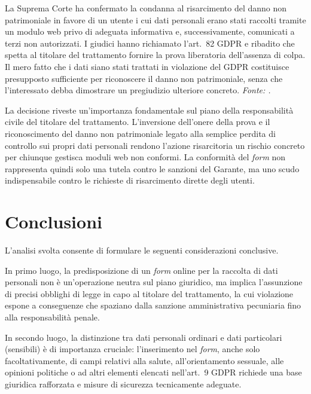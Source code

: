 \documentclass[12pt, a4paper]{article}
\begin{document}
\begin{sentenzabox}
  La Suprema Corte ha confermato la condanna al risarcimento del danno non
  patrimoniale in favore di un utente i cui dati personali erano stati raccolti
  tramite un modulo web privo di adeguata informativa e, successivamente,
  comunicati a terzi non autorizzati. I giudici hanno richiamato l'art.~82 GDPR
  e ribadito che spetta al titolare del trattamento fornire la prova liberatoria
  dell'assenza di colpa. Il mero fatto che i dati siano stati trattati in violazione
  del GDPR costituisce presupposto sufficiente per riconoscere il danno
  non patrimoniale, senza che l'interessato debba dimostrare un pregiudizio
  ulteriore concreto.
  \newline
  {\scriptsize \textit{Fonte: \autocite{cass2023_privacyform}.}}
\end{sentenzabox}

\medskip

La decisione riveste un'importanza fondamentale sul piano della responsabilità civile del titolare 
del trattamento. L'inversione dell'onere della prova e il riconoscimento del danno non patrimoniale 
legato alla semplice perdita di controllo sui propri dati personali rendono l'azione risarcitoria 
un rischio concreto per chiunque gestisca moduli web non conformi. 
La conformità del \emph{form} non rappresenta quindi solo una tutela contro le sanzioni del Garante, 
ma uno scudo indispensabile contro le richieste di risarcimento dirette degli utenti.

\section{Conclusioni}
\label{sec:conclusioni}

L'analisi svolta consente di formulare le seguenti considerazioni conclusive.

In primo luogo, la predisposizione di un \emph{form} online per la raccolta di
dati personali non è un'operazione neutra sul piano giuridico, ma implica
l'assunzione di precisi obblighi di legge in capo al titolare del trattamento,
la cui violazione espone a conseguenze che spaziano dalla sanzione amministrativa
pecuniaria fino alla responsabilità penale.

In secondo luogo, la distinzione tra dati personali ordinari e dati particolari
(sensibili) è di importanza cruciale: l'inserimento nel \emph{form}, anche solo
facoltativamente, di campi relativi alla salute, all'orientamento sessuale, alle
opinioni politiche o ad altri elementi elencati nell'art.~9 GDPR richiede
una base giuridica rafforzata e misure di sicurezza tecnicamente adeguate.
\end{document}
